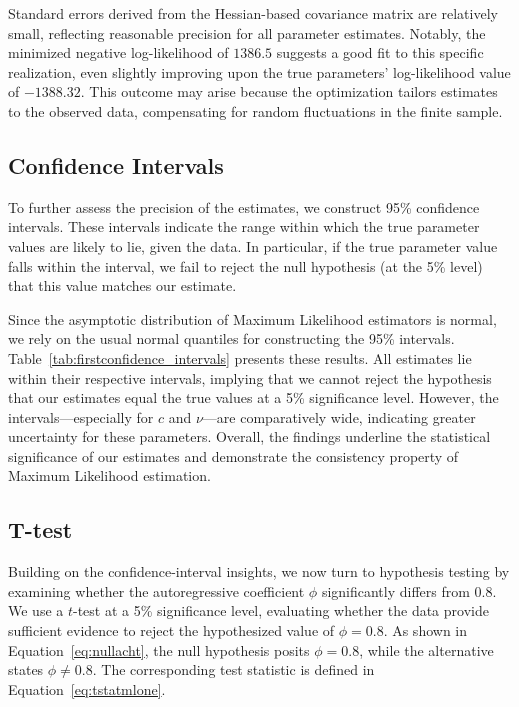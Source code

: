 \documentclass[a4paper,12pt]{article}
\begin{document}
Standard errors derived from the Hessian-based covariance matrix are relatively small, reflecting reasonable precision for all parameter estimates. Notably, the minimized negative log-likelihood of \(1386.5\) suggests a good fit to this specific realization, even slightly improving upon the true parameters’ log-likelihood value of \(-1388.32\). This outcome may arise because the optimization tailors estimates to the observed data, compensating for random fluctuations in the finite sample.

\subsection{Confidence Intervals}
To further assess the precision of the estimates, we construct 95\% confidence intervals. These intervals indicate the range within which the true parameter values are likely to lie, given the data. In particular, if the true parameter value falls within the interval, we fail to reject the null hypothesis (at the 5\% level) that this value matches our estimate.

Since the asymptotic distribution of Maximum Likelihood estimators is normal, we rely on the usual normal quantiles for constructing the 95\% intervals. Table~\ref{tab:firstconfidence_intervals} presents these results. All estimates lie within their respective intervals, implying that we cannot reject the hypothesis that our estimates equal the true values at a 5\% significance level. However, the intervals—especially for \(c\) and \(\nu\)—are comparatively wide, indicating greater uncertainty for these parameters. Overall, the findings underline the statistical significance of our estimates and demonstrate the consistency property of Maximum Likelihood estimation.

\subsection{T-test}
Building on the confidence-interval insights, we now turn to hypothesis testing by examining whether the autoregressive coefficient \(\phi\) significantly differs from 0.8. We use a \(t\)-test at a 5\% significance level, evaluating whether the data provide sufficient evidence to reject the hypothesized value of \(\phi = 0.8\). As shown in Equation~\ref{eq:nullacht}, the null hypothesis posits \(\phi = 0.8\), while the alternative states \(\phi \neq 0.8\). The corresponding test statistic is defined in Equation~\ref{eq:tstatmlone}.
\end{document}
